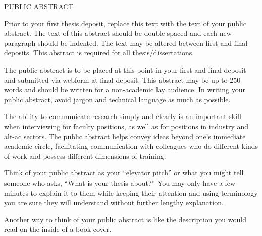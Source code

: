 \begin{doublespace}
\begin{tightcenter}
PUBLIC ABSTRACT
\mylinespacing
\end{tightcenter}


Prior to your first thesis deposit, replace this text with the text of your public abstract. The text of this abstract should be double spaced and each new paragraph should be indented. The text may be altered between first and final deposits. This abstract is required for all thesis/dissertations. 

The public abstract is to be placed at this point in your first and final deposit and submitted via webform at final deposit. This abstract may be up to 250 words and should be written for a non-academic lay audience. In writing your public abstract, avoid jargon and technical language as much as possible. 

The ability to communicate research simply and clearly is an important skill when interviewing for faculty positions, as well as for positions in industry and alt-ac sectors. The public abstract helps convey ideas beyond one’s immediate academic circle, facilitating communication with colleagues who do different kinds of work and possess different dimensions of training.

Think of your public abstract as your “elevator pitch” or what you might tell someone who asks, “What is your thesis about?” You may only have a few minutes to explain it to them while keeping their attention and using terminology you are sure they will understand without further lengthy explanation.

Another way to think of your public abstract is like the description you would read on the inside of a book cover.

\end{doublespace}
